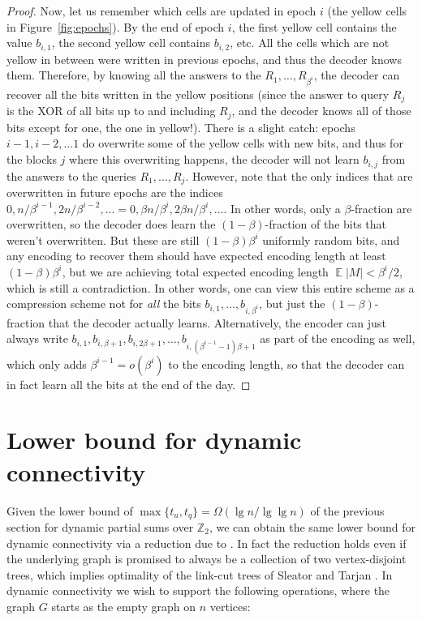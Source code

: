 \documentclass[11pt]{article}
\DeclareMathOperator*{\E}{\mathbb{E}}
\begin{document}
\begin{proof}
Now, let us remember which cells are updated in epoch $i$ (the yellow cells in Figure~\ref{fig:epochs}). By the end of epoch $i$, the first yellow cell contains the value $b_{i,1}$, the second yellow cell contains $b_{i,2}$, etc. All the cells which are not yellow in between were written in previous epochs, and thus the decoder knows them. Therefore, by knowing all the answers to the $R_1,\ldots,R_{\beta^i}$, the decoder can recover all the bits written in the yellow positions (since the answer to query $R_j$ is the XOR of all bits up to and including $R_j$, and the decoder knows all of those bits except for one, the one in yellow!). There is a slight catch: epochs $i-1,i-2,\ldots 1$ do overwrite some of the yellow cells with new bits, and thus for the blocks $j$ where this overwriting happens, the decoder will not learn $b_{i,j}$ from the answers to the queries $R_1,\ldots,R_j$. However, note that the only indices that are overwritten in future epochs are the indices $0, n/\beta^{i-1}, 2n/\beta^{i-2}, \ldots = 0, \beta n/\beta^i, 2\beta n/ \beta^i, \ldots$. In other words, only a $\beta$-fraction are overwritten, so the decoder does learn the $(1-\beta)$-fraction of the bits that weren't overwritten. But these are still $(1-\beta)\beta^i$ uniformly random bits, and any encoding to recover them should have expected encoding length at least $(1-\beta)\beta^i$, but we are achieving total expected encoding length $\E |M| < \beta^i/2$, which is still a contradiction. In other words, one can view this entire scheme as a compression scheme not for {\em all} the bits $b_{i,1},\ldots,b_{i,\beta^i}$, but just the $(1-\beta)$-fraction that the decoder actually learns. Alternatively, the encoder can just always write $b_{i,1}, b_{i,\beta + 1},b_{i,2\beta + 1}, \ldots, b_{i, (\beta^{i-1}-1)\beta + 1}$ as part of the encoding as well, which only adds $\beta^{i-1} = o(\beta^i)$ to the encoding length, so that the decoder can in fact learn all the bits at the end of the day.
\end{proof}

\section{Lower bound for dynamic connectivity}

Given the lower bound of $\max\{t_u, t_q\} = \Omega(\lg n / \lg\lg n)$ of the previous section for dynamic partial sums over $\mathbb Z_2$, we can obtain the same lower bound for dynamic connectivity via a reduction due to \cite{MiltersenSVT94}. In fact the reduction holds even if the underlying graph is promised to always be a collection of two vertex-disjoint trees, which implies optimality of the link-cut trees of Sleator and Tarjan \cite{SleatorT83}. In dynamic connectivity we wish to support the following operations, where the graph $G$ starts as the empty graph on $n$ vertices:
\end{document}
